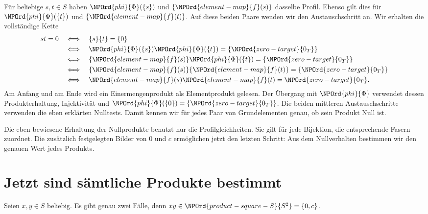 Für beliebige \(s,t\in S\) haben \(\NPOrd{phi}{\Phi}(\{s\})\) und \(\{\NPOrd{element-map}{f}(s)\}\)
dasselbe Profil. Ebenso gilt dies für \(\NPOrd{phi}{\Phi}(\{t\})\) und \(\{\NPOrd{element-map}{f}(t)\}\).
Auf diese beiden Paare wenden wir den Austauschschritt an.
Wir erhalten die vollständige Kette
\[
 \begin{aligned}
 st=0
 &\quad\Longleftrightarrow\quad\{s\}\{t\}=\{0\}\\
 &\quad\Longleftrightarrow\quad
       \NPOrd{phi}{\Phi}(\{s\})\NPOrd{phi}{\Phi}(\{t\})=\{\NPOrd{zero-target}{0_T}\}\\
 &\quad\Longleftrightarrow\quad
       \{\NPOrd{element-map}{f}(s)\}\NPOrd{phi}{\Phi}(\{t\})=\{\NPOrd{zero-target}{0_T}\}\\
 &\quad\Longleftrightarrow\quad
       \{\NPOrd{element-map}{f}(s)\}\{\NPOrd{element-map}{f}(t)\}=\{\NPOrd{zero-target}{0_T}\}\\
 &\quad\Longleftrightarrow\quad \NPOrd{element-map}{f}(s)\NPOrd{element-map}{f}(t)=\NPOrd{zero-target}{0_T}.
 \end{aligned}
\]
Am Anfang und am Ende wird ein Einermengenprodukt als Elementprodukt
gelesen. Der Übergang mit \(\NPOrd{phi}{\Phi}\) verwendet dessen Produkterhaltung,
Injektivität und \(\NPOrd{phi}{\Phi}(\{0\})=\{\NPOrd{zero-target}{0_T}\}\).
Die beiden mittleren Austauschschritte verwenden die eben erklärten
Nulltests. Damit kennen wir für jedes Paar von Grundelementen genau,
ob sein Produkt Null ist.

Die eben bewiesene Erhaltung der Nullprodukte benutzt nur die
Profilgleichheiten. Sie gilt für jede Bijektion, die entsprechende
Fasern zuordnet. Die zusätzlich festgelegten Bilder von \(0\) und
\(c\) ermöglichen jetzt den letzten Schritt: Aus dem Nullverhalten
bestimmen wir den genauen Wert jedes Produkts.

\par{}
\section*{Jetzt sind sämtliche Produkte bestimmt}

Seien \(x,y\in S\) beliebig. Es gibt genau zwei Fälle, denn
\(xy\in \NPOrd{product-square-S}{S^2}=\{0,c\}\).

